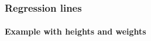 \begin{frame}
\frametitle{Regression lines}
\framesubtitle{Example with heights and weights}
\begin{center}
\resizebox{0.9\textwidth}{!}{}
\end{center}
\end{frame}


% 
% 
% 
% 
